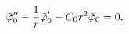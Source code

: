 \begin{equation}
{\tilde \varphi_0}''
- {1 \over r} {\tilde \varphi_0}' - C_0 r^2 \tilde \varphi_0
=0,
\label{eq_approx_r0}
\end{equation}

